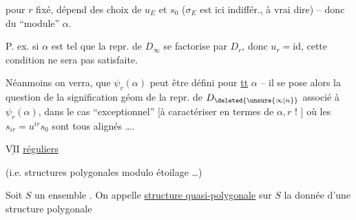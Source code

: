  pour $r$ fixé,   dépend des  choix de $u_E$ et $s_0$ ($\sigma_E$ est ici indiffér., à vrai dire) -- donc du ``module'' $\alpha$.

 P. ex. si  $\alpha$ est tel que la repr. de $D_\infty$ se factorise par $D_r$, donc $u_r=\mathrm{id}$, cette condition ne sera pas satisfaite.

Néanmoins on verra,  que $\psi_r(\alpha)$ peut être défini pour \uline{tt} $\alpha$ -- il se pose alors la question de la signification géom de  la repr. de $D_{\deleted{\unsure{\infty|n}}}$ associé à $\psi_r(\alpha)$, dans le cas ``exceptionnel'' [à caractériser en termes de $\alpha,r$ ! ] où les $s_{ir}=u^{ir}s_0$ sont tous alignés \ldots.

$\overline{\underline{\mathrm{VII}}}$   \uline{réguliers}  

(i.e. structures polygonales modulo étoilage \ldots)

Soit $S$ un ensemble . On appelle \uline{structure quasi-polygonale}  sur $S$ la donnée d'une structure polygonale

